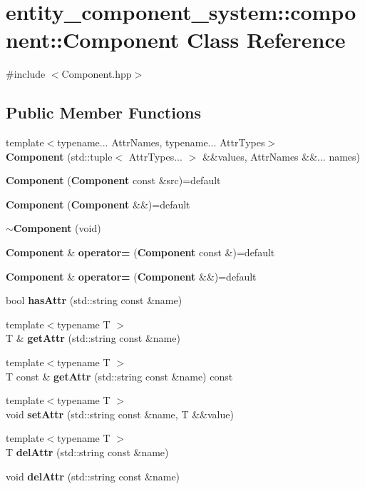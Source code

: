 \section{entity\+\_\+component\+\_\+system\+:\+:component\+:\+:Component Class Reference}
\label{classentity__component__system_1_1component_1_1_component}


{\ttfamily \#include $<$Component.\+hpp$>$}

\subsection*{Public Member Functions}
\begin{DoxyCompactItemize}
\item 
{\footnotesize template$<$typename... Attr\+Names, typename... Attr\+Types$>$ }\\{\bf Component} (std\+::tuple$<$ Attr\+Types... $>$ \&\&values, Attr\+Names \&\&... names)
\item 
{\bf Component} ({\bf Component} const \&src)=default
\item 
{\bf Component} ({\bf Component} \&\&)=default
\item 
{\bf $\sim$\+Component} (void)
\item 
{\bf Component} \& {\bf operator=} ({\bf Component} const \&)=default
\item 
{\bf Component} \& {\bf operator=} ({\bf Component} \&\&)=default
\item 
bool {\bf has\+Attr} (std\+::string const \&name)
\item 
{\footnotesize template$<$typename T $>$ }\\T \& {\bf get\+Attr} (std\+::string const \&name)
\item 
{\footnotesize template$<$typename T $>$ }\\T const  \& {\bf get\+Attr} (std\+::string const \&name) const
\item 
{\footnotesize template$<$typename T $>$ }\\void {\bf set\+Attr} (std\+::string const \&name, T \&\&value)
\item 
{\footnotesize template$<$typename T $>$ }\\T {\bf del\+Attr} (std\+::string const \&name)
\item 
void {\bf del\+Attr} (std\+::string const \&name)
\end{DoxyCompactItemize}
